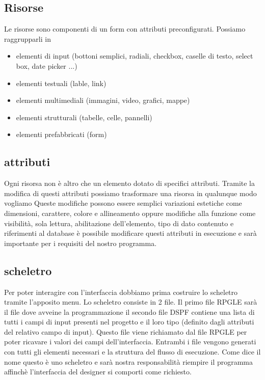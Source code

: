 \documentclass[target=bach,aauheader=,style=]{thud}
\begin{document}
\subsection{Risorse}
Le risorse sono componenti di un form con attributi preconfigurati.
Possiamo raggrupparli in
\begin{itemize}
    \item elementi di input (bottoni semplici, radiali, checkbox, caselle di testo, select box, date picker ...)
    \item elementi testuali (lable, link)
    \item elementi multimediali (immagini, video, grafici, mappe)
    \item elementi strutturali (tabelle, celle, pannelli)
    \item elementi prefabbricati (form)
\end{itemize}

\subsection{attributi}
Ogni risorsa non è altro che un elemento dotato di specifici attributi.
Tramite la modifica di questi attributi possiamo trasformare una risorsa in qualunque modo vogliamo
Queste modifiche possono essere semplici variazioni estetiche come dimensioni, carattere, colore e allineamento oppure 
modifiche alla funzione come visibilità, sola lettura, abilitazione dell'elemento, tipo di dato contenuto e riferimenti al database
è possibile modificare questi attributi in esecuzione e sarà importante per i requisiti del nostro programma.

\subsection{scheletro}
Per poter interagire con l'interfaccia dobbiamo prima costruire lo scheletro tramite l'apposito menu. 
Lo scheletro consiste in 2 file.
Il primo file RPGLE sarà il file dove avveine la programmazione
il secondo file DSPF contiene una lista di tutti i campi di input presenti nel progetto e il loro tipo (definito dagli attributi del relativo campo di input). 
Questo file viene richiamato dal file RPGLE per poter ricavare i valori dei campi dell'interfaccia.
Entrambi i file vengono generati con tutti gli elementi necessari e la struttura del flusso di esecuzione.
Come dice il nome questo è uno scheletro e sarà nostra responsabilità riempire il programma affinchè l'interfaccia del designer si comporti come richiesto.
\end{document}
